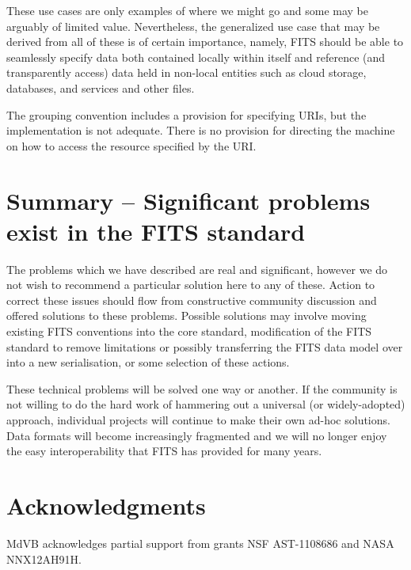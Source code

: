 \documentclass[final,authoryear,5p,times,twocolumn]{elsarticle}
\begin{document}
These use cases are only examples of where we might go and some may be
arguably of limited value. Nevertheless, the generalized use case that
may be derived from all of these is of certain importance, namely,
FITS should be able to seamlessly specify data both contained locally
within itself and reference (and transparently access) data held in
non-local entities such as cloud storage, databases, and services and
other files.


The grouping convention includes a provision for specifying URIs,
but the implementation is not adequate. There is no provision for
directing the machine on how to access the resource specified by the
URI.


\section{Summary -- Significant problems exist in the FITS standard}


The problems which we have described are real and significant, however
we do not wish to recommend a particular solution here to any of
these. Action to correct these issues should flow from constructive
community discussion and offered solutions to these problems. Possible
solutions may involve moving existing FITS conventions into the core
standard, modification of the FITS standard to remove limitations or
possibly transferring the FITS data model over into a new
serialisation, or some selection of these actions.


These technical problems will be solved one way or another. If the
community is not willing to do the hard work of hammering out a
universal (or widely-adopted) approach, individual projects will
continue to make their own ad-hoc solutions. Data formats will become
increasingly fragmented and we will no longer enjoy the easy
interoperability that FITS has provided for many years.

\section{Acknowledgments}


MdVB acknowledges partial support from grants NSF AST-1108686 and NASA
NNX12AH91H.



\end{document}
